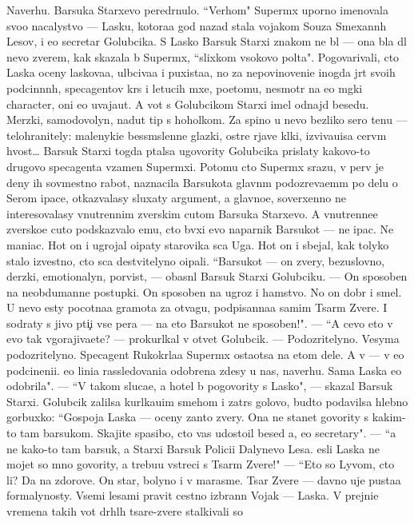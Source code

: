 \documentclass[12pt]{book}
\begin{document}
Naverhu. Barsuka Starxevo pered{\e}rnulo. ``Verhom" Superm{\yi}x uporno ime\-no\-va\-la svo{\y}o nacalystvo — Lasku, kotora{\y}a god nazad stala vojakom So{\y}uza Smexann{\yi}h Lesov, i {\y}e{\y}o secretar{\ia} Golubcika. S Lasko{\y} Barsuk Starxi{\y} znakom ne b{\yi}l — ona b{\yi}la dl{\ia} nevo zverem, kak skazala b{\yi} Superm{\yi}x, ``slixkom v{\yi}\-so\-ko\-vo pol{\e}ta". Pogovarivali, cto Laska oceny laskova{\y}a, ul{\yi}bciva{\y}a i puxista{\y}a, no za nepovinoveni{\y}e inogda jr{\e}t svo{\y}ih podcin{\e}nn{\yi}h, specagentov kr{\yi}s i letucih m{\yi}xe{\y}, poetomu, ne\-smo\-tr{\ia} na {\y}e{\y}o m{\ia}gki{\y} character, oni {\y}e{\y}o uvaja{\y}ut. A vot s Golubcikom Starxi{\y} imel od\-naj\-d{\yi} besedu. Merzki{\y}, samodovolyn{\yi}{\y}, nadut{\yi}{\y} tip s hoholkom. Za spino{\y} u nevo bezliko{\y} sero{\y} ten{\y}u — telohranitely: malenyki{\y}e bessm{\yi}slenn{\yi}{\y}e glazki, ostr{\yi}{\y}e rjav{\yi}{\y}e kl{\yi}ki, izviva{\y}u{\x}i{\y}sa cer\-v{\e}m hvost… Barsuk Starxi{\y} togda p{\yi}talsa ugovority Golubcika prislaty kakovo-to drugovo specagenta vzamen Superm{\yi}xi. Potomu cto Superm{\yi}x srazu, v perv{\yi}{\y} je deny ih sovmestno{\y} rabot{\yi}, naznacila Barsukota glavn{\yi}m po\-do\-zre\-va\-{\y}e\-m{\yi}m po delu o Serom {\X}ipace, otkaz{\yi}valasy sluxaty argument{\yi}, a glavno{\y}e, soverxenno ne interesovalasy vnutrennim zverskim cut{\y}om Barsuka Starxevo. A vnutrenne{\y}e zversko{\y}e cut{\y}o podskaz{\yi}valo {\y}emu, cto b{\yi}vxi{\y} {\y}evo naparnik Barsukot — ne {\X}ipac. Ne maniac. Hot{\ia} on i ugrojal o{\x}ipaty star{\y}ov{\x}ika s{\yi}ca Uga. Hot{\ia} on i sbejal, kak tolyko stalo izvestno, cto s{\yi}ca de{\y}stvitelyno o{\x}ipali. ``Barsukot — on zvery, bezuslovno, derzki{\y}, emo\-ti\-o\-naly\-n{\yi}{\y}, por{\yi}vist{\yi}{\y}, — ob{\y}asn{\ia}l Barsuk Starxi{\y} Golubciku. — On sposoben na neobdumann{\yi}{\y}e postupki. On sposoben na ugroz{\yi} i hamstvo. No on dobr{\yi}{\y} i smel{\yi}{\y}. U nevo {\y}esty pocotna{\y}a gramota za otvagu, podpisanna{\y}a samim Tsar{\e}m Zvere{\y}. I sodraty s jivo{\y} pti{\c}i vse per{\y}a — na eto Barsukot ne sposoben!". — ``A cevo eto v{\yi} {\y}evo tak v{\yi}gorajiva{\y}ete? — prokurl{\yi}kal v otvet Golubcik. — Podozritelyno. Vesyma podozritelyno. Specagent Rukokr{\yi}la{\y}a Superm{\yi}x osta{\y}otsa na etom dele. A v{\yi} — v {\y}e{\y}o podcineni{\y}i. {\Y}e{\y}o lini{\y}a rassledovani{\y}a odobrena zdesy u nas, naverhu. Sama Laska {\y}e{\y}o odobrila". — ``V takom sluca{\y}e, {\y}a hotel b{\yi} po\-go\-vo\-rity s Lasko{\y}", — skazal Barsuk Starxi{\y}. Golubcik zalilsa kurl{\yi}ka{\y}u{\x}im smehom i zatr{\ia}s go\-lo\-vo{\y}, budto podavilsa hlebno{\y} gorbuxko{\y}: ``Gospoja Laska — oceny zan{\ia}to{\y} zvery. Ona ne stanet govority s kakim-to tam barsukom. Skajite spasibo, cto vas udostoil besed{\yi} {\y}a, {\y}e{\y}o secretary". — ``{\Y}a ne kako{\y}-to tam barsuk, a Starxi{\y} Barsuk Polici{\y}i Dalynevo Lesa. {\Y}esli Laska ne mojet so mno{\y} govority, {\y}a trebu{\y}u vstreci s Tsar{\e}m Zvere{\y}!" — ``Eto so Lyvom, cto li? Da na zdorov{\y}e. On star{\yi}{\y}, bolyno{\y} i v marasme. Tsar Zvere{\y} — davno uje pusta{\y}a formalynosty. Vsemi lesami pravit cestno izbrann{\yi}{\y} Vojak — Laska. V prejni{\y}e vremena takih vot dr{\ia}hl{\yi}h tsare{\y}-zvere{\y} stalkivali so 
\end{document}
